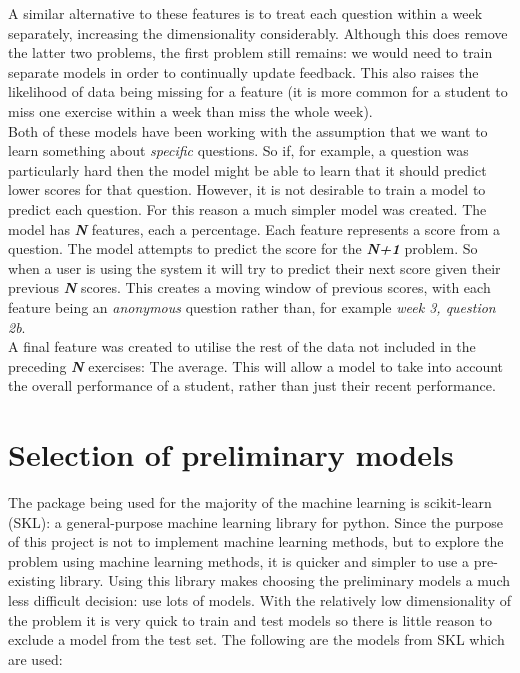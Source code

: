 A similar alternative to these features is to treat each question within a week separately, increasing the dimensionality considerably. Although this does remove the latter two problems, the first problem still remains: we would need to train separate models in order to continually update feedback. This also raises the likelihood of data being missing for a feature (it is more common for a student to miss one exercise within a week than miss the whole week).
\\
Both of these models have been working with the assumption that we want to learn something about \emph{specific} questions. So if, for example, a question was particularly hard then the model might be able to learn that it should predict lower scores for that question. However, it is not desirable to train a model to predict each question. For this reason a much simpler model was created. The model has \textit{\textbf{N}} features, each a percentage. Each feature represents a score from a question. The model attempts to predict the score for the \textit{\textbf{N+1}} problem. So when a user is using the system it will try to predict their next score given their previous \textit{\textbf{N}} scores. This creates a moving window of previous scores, with each feature being an \emph{anonymous} question rather than, for example \emph{week 3, question 2b}.
\\
A final feature was created to utilise the rest of the data not included in the preceding \textit{\textbf{N}} exercises: The average. This will allow a model to take into account the overall performance of a student, rather than just their recent performance.

\section{Selection of preliminary models}
The package being used for the majority of the machine learning is scikit-learn (SKL): a general-purpose machine learning library for python. Since the purpose of this project is not to implement machine learning methods, but to explore the problem using machine learning methods, it is quicker and simpler to use a pre-existing library. Using this library makes choosing the preliminary models a much less difficult decision: use lots of models. With the relatively low dimensionality of the problem it is very quick to train and test models so there is little reason to exclude a model from the test set. The following are the models from SKL which are used:

